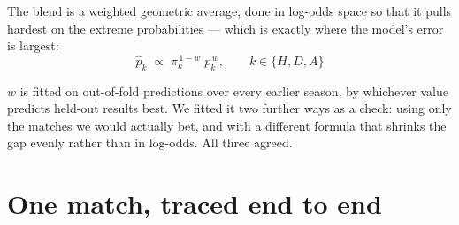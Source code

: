 \documentclass[11pt,a4paper]{article}
\begin{document}
The blend is a weighted geometric average, done in log-odds space so that it
pulls hardest on the extreme probabilities --- which is exactly where the
model's error is largest:
\[
\hat p_k \;\propto\; \pi_k^{\,1-w}\; p_k^{\,w},
\qquad k \in \{H,D,A\}
\]

\begin{center}
\end{center}

$w$ is fitted on out-of-fold predictions over every earlier season, by whichever
value predicts held-out results best. We fitted it two further ways as a check:
using only the matches we would actually bet, and with a different formula that
shrinks the gap evenly rather than in log-odds. All three agreed.

\newpage
\section*{One match, traced end to end}
\end{document}
